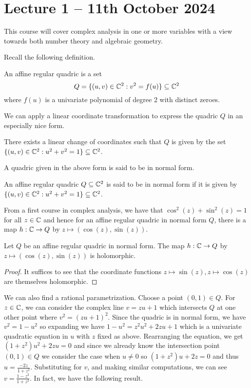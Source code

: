 \section{Lecture 1 -- 11th October 2024}\label{sec: lecture 1}
This course will cover complex analysis in one or more variables with a view towards both number theory and algebraic geometry. 

Recall the following definition. 
\begin{definition}\label{def: affine regular quadric}
    An affine regular quadric is a set  
    $$Q=\{(u,v)\in\mathbb{C}^{2}:v^{2}=f(u)\}\subseteq\mathbb{C}^{2}$$
    where $f(u)$ is a univariate polynomial of degree 2 with distinct zeroes.
\end{definition}
We can apply a linear coordinate transformation to express the quadric $Q$ in an especially nice form. 
\begin{proposition}\label{prop: existence of canonical form}
    There exists a linear change of coordinates such that $Q$ is given by the set $\{(u,v)\in\mathbb{C}^{2}:u^{2}+v^{2}=1\}\subseteq\mathbb{C}^{2}$.
\end{proposition}
A quadric given in the above form is said to be in normal form. 
\begin{definition}\label{def: normal form quadric}
    An affine regular quadric $Q\subseteq\mathbb{C}^{2}$ is said to be in normal form if it is given by $\{(u,v)\in\mathbb{C}^{2}:u^{2}+v^{2}=1\}\subseteq\mathbb{C}^{2}$.
\end{definition}
From a first course in complex analysis, we have that $\cos^{2}(z)+\sin^{2}(z)=1$ for all $z\in\mathbb{C}$ and hence for an affine regular quadric in normal form $Q$, there is a map $h:\mathbb{C}\to Q$ by $z\mapsto(\cos(z),\sin(z))$. 
\begin{proposition}\label{prop: holomorphic parameterization}
    Let $Q$ be an affine regular quadric in normal form. The map $h:\mathbb{C}\to Q$ by $z\mapsto(\cos(z),\sin(z))$ is holomorphic. 
\end{proposition}
\begin{proof}
    It suffices to see that the coordinate functions $z\mapsto\sin(z), z\mapsto\cos(z)$ are themselves holomorphic.
\end{proof}
We can also find a rational parametrization. Choose a point $(0,1)\in Q$. For $z\in\mathbb{C}$, we can consider the complex line $v=zu+1$ which intersects $Q$ at one other point where $v^{2}=(zu+1)^{2}$. Since the quadric is in normal form, we have $v^{2}=1-u^{2}$ so expanding we have $1-u^{2}=z^{2}u^{2}+2zu+1$ which is a univariate quadratic equation in $u$ with $z$ fixed as above. Rearranging the equation, we get $(1+z^{2})u^{2}+2zu=0$ and since we already know the intersection point $(0,1)\in Q$ we consider the case when $u\neq0$ so $(1+z^{2})u+2z=0$ and thus $u=\frac{-2z}{1+z^{2}}$. Substituting for $v$, and making similar computations, we can see $v=\frac{1-z^{2}}{1+z^{2}}$. In fact, we have the following result. 

